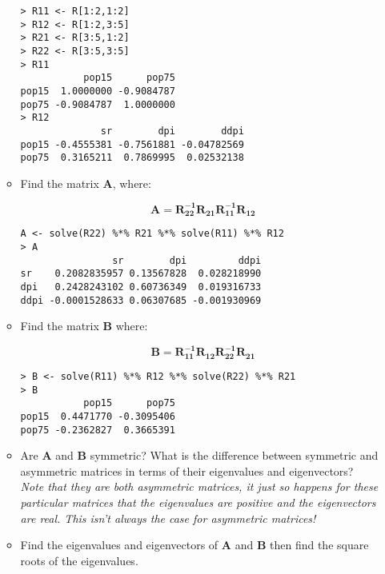 \documentclass{article}
\begin{document}
\begin{enumerate}
\begin{itemize}
\begin{verbatim}
> R11 <- R[1:2,1:2]
> R12 <- R[1:2,3:5]
> R21 <- R[3:5,1:2]
> R22 <- R[3:5,3:5]
> R11
           pop15      pop75
pop15  1.0000000 -0.9084787
pop75 -0.9084787  1.0000000
> R12
              sr        dpi        ddpi
pop15 -0.4555381 -0.7561881 -0.04782569
pop75  0.3165211  0.7869995  0.02532138
\end{verbatim}

\item Find the matrix $\boldsymbol{A}$, where:

\begin{displaymath}
\boldsymbol{A} = \boldsymbol{R_{22}^{-1}R_{21}R_{11}^{-1}R_{12}}
\end{displaymath}

\begin{verbatim}
A <- solve(R22) %*% R21 %*% solve(R11) %*% R12
> A
                sr        dpi         ddpi
sr    0.2082835957 0.13567828  0.028218990
dpi   0.2428243102 0.60736349  0.019316733
ddpi -0.0001528633 0.06307685 -0.001930969
\end{verbatim}


\item Find the matrix $\boldsymbol{B}$ where:

\begin{displaymath}
\boldsymbol{B} = \boldsymbol{R_{11}^{-1}R_{12}R_{22}^{-1}R_{21}}
\end{displaymath}

\begin{verbatim}
> B <- solve(R11) %*% R12 %*% solve(R22) %*% R21
> B
           pop15      pop75
pop15  0.4471770 -0.3095406
pop75 -0.2362827  0.3665391
\end{verbatim}




\item Are $\boldsymbol{A}$ and $\boldsymbol{B}$ symmetric?   What is the difference between symmetric and asymmetric matrices in terms of their eigenvalues and eigenvectors?\\
\textit{Note that they are both asymmetric matrices, it just so happens for these particular matrices that the eigenvalues are positive and the eigenvectors are real.   This isn't always the case for asymmetric matrices!}

\item Find the eigenvalues and eigenvectors of $\boldsymbol{A}$ and $\boldsymbol{B}$ then find the square roots of the eigenvalues.   



\end{itemize}
\end{enumerate}
\end{document}
